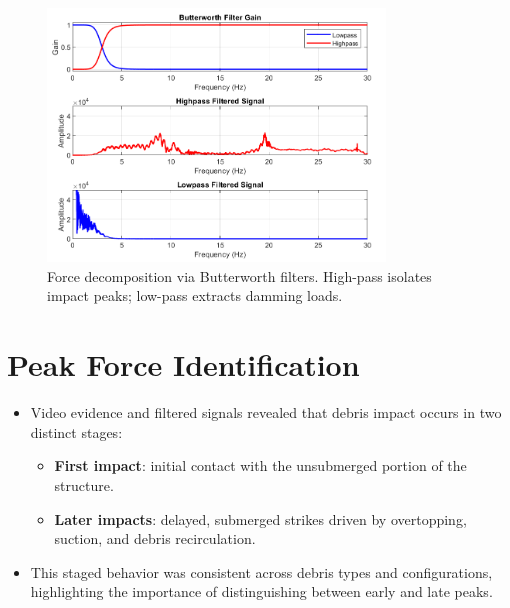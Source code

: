 \documentclass{article}
\begin{document}
\begin{figure}[htbp]
    \centering
    \includegraphics[width=0.8\textwidth]{high_low_pass.png}
    \caption{Force decomposition via Butterworth filters. High-pass isolates impact peaks; low-pass extracts damming loads.}
    \label{fig:high_low_pass}
\end{figure}

\section{Peak Force Identification}
\begin{itemize}
    \item Video evidence and filtered signals revealed that debris impact occurs in two distinct stages:
    \begin{itemize}
        \item \textbf{First impact}: initial contact with the unsubmerged portion of the structure.
        \item \textbf{Later impacts}: delayed, submerged strikes driven by overtopping, suction, and debris recirculation.
    \end{itemize}
    \item This staged behavior was consistent across debris types and configurations, highlighting the importance of distinguishing between early and late peaks.
\end{itemize}
\end{document}
